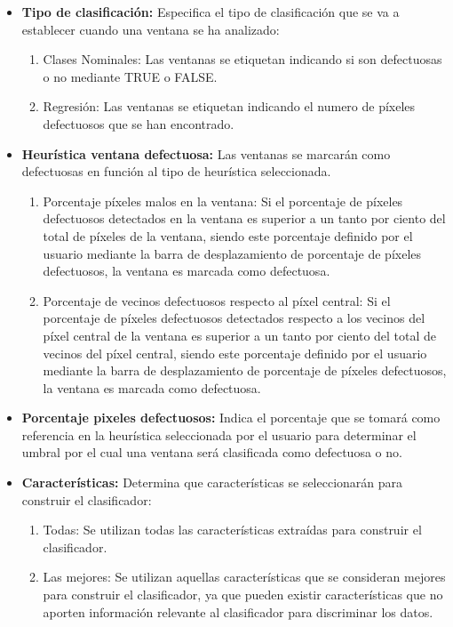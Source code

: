 \begin{itemize}
\item \textbf{Tipo de clasificación:} Especifica el tipo de clasificación que se va a establecer cuando una ventana se ha analizado:

\begin{enumerate}
\item Clases Nominales: Las ventanas se etiquetan indicando si son defectuosas o no mediante TRUE o FALSE.
\item Regresión: Las ventanas se etiquetan indicando el numero de píxeles defectuosos que se han encontrado.
\end{enumerate}

\item \textbf{Heurística ventana defectuosa:} Las ventanas se marcarán como defectuosas en función al tipo de heurística seleccionada.

\begin{enumerate}
\item Porcentaje píxeles malos en la ventana: Si el porcentaje de píxeles defectuosos detectados en la ventana es superior a un tanto por ciento del total de píxeles de la ventana, siendo este porcentaje definido por el usuario mediante la barra de desplazamiento de porcentaje de píxeles defectuosos, la ventana es marcada como defectuosa.
\item Porcentaje de vecinos defectuosos respecto al píxel central: Si el porcentaje de píxeles defectuosos detectados respecto a los vecinos del píxel central de la ventana es superior a un tanto por ciento del total de vecinos del píxel central, siendo este porcentaje definido por el usuario mediante la barra de desplazamiento de porcentaje de píxeles defectuosos, la ventana es marcada como defectuosa.
\end{enumerate}

\item \textbf{Porcentaje pixeles defectuosos:} Indica el porcentaje que se tomará como referencia en la heurística seleccionada por el usuario para determinar el umbral por el cual una ventana será clasificada como defectuosa o no.

\item \textbf{Características:} Determina que características se seleccionarán para construir el clasificador:

\begin{enumerate}
\item Todas: Se utilizan todas las características extraídas para construir el clasificador.
\item Las mejores: Se utilizan aquellas características que se consideran mejores para construir el clasificador, ya que pueden existir características que no aporten información relevante al clasificador para discriminar los datos.
\end{enumerate}

\end{itemize}

